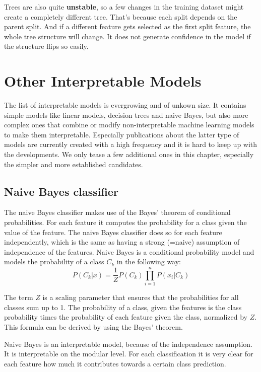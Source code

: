 \documentclass[12pt,]{krantz}
\theoremstyle{definition}
\theoremstyle{definition}
\theoremstyle{definition}
\theoremstyle{remark}
\begin{document}
Trees are also quite \textbf{unstable}, so a few changes in the training
dataset might create a completely different tree. That's because each
split depends on the parent split. And if a different feature gets
selected as the first split feature, the whole tree structure will
change. It does not generate confidence in the model if the structure
flips so easily.

\section{Other Interpretable Models}\label{other-interpretable-models}

The list of interpretable models is evergrowing and of unkown size. It
contains simple models like linear models, decision trees and naive
Bayes, but also more complex ones that combine or modify
non-interpretable machine learning models to make them interpretable.
Especially publications about the latter type of models are currently
created with a high frequency and it is hard to keep up with the
developments. We only tease a few additional ones in this chapter,
especially the simpler and more established candidates.

\subsection{Naive Bayes classifier}\label{naive-bayes-classifier}

The naive Bayes classifier makes use of the Bayes' theorem of
conditional probabilities. For each feature it computes the probability
for a class given the value of the feature. The naive Bayes classifier
does so for each feature independently, which is the same as having a
strong (=naive) assumption of independence of the features. Naive Bayes
is a conditional probability model and models the probability of a class
\(C_k\) in the following way:
\[ P(C_k|x) = \frac{1}{Z} P(C_k) \prod_{i=1}^n P(x_i | C_k)\]

The term \(Z\) is a scaling parameter that ensures that the
probabilities for all classes sum up to 1. The probability of a class,
given the features is the class probability times the probability of
each feature given the class, normalized by \(Z\). This formula can be
derived by using the Bayes' theorem.

Naive Bayes is an interpretable model, because of the independence
assumption. It is interpretable on the modular level. For each
classification it is very clear for each feature how much it contributes
towards a certain class prediction.
\end{document}
